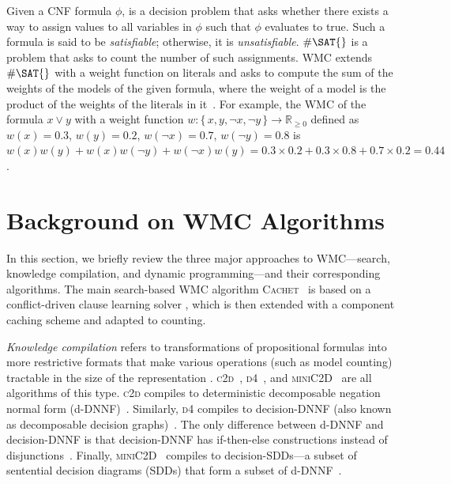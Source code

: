 \documentclass{article}
\theoremstyle{definition}
\begin{document}
Given a CNF formula $\phi$, \SAT{} is a decision problem that asks whether there
exists a way to assign values to all variables in $\phi$ such that $\phi$
evaluates to true. Such a formula is said to be \emph{satisfiable}; otherwise,
it is \emph{unsatisfiable}. $\#\SAT{}$ is a problem that asks to count the
number of such assignments. \textsf{WMC} extends $\#\SAT{}$ with a weight
function on literals and asks to compute the sum of the weights of the models of
the given formula, where the weight of a model is the product of the weights of
the literals in it~\cite{DBLP:journals/ai/ChaviraD08}. For example, the
\textsf{WMC} of the formula $x \lor y$ with a weight function $w\colon \{\,x, y,
\neg x, \neg y\,\} \to \mathbb{R}_{\ge 0}$ defined as $w(x) = 0.3$, $w(y) = 0.2$,
$w(\neg x) = 0.7$, $w(\neg y) = 0.8$ is $w(x)w(y)+w(x)w(\neg y)+w(\neg x)w(y) =
0.3 \times 0.2 + 0.3 \times 0.8 + 0.7 \times 0.2 = 0.44$.

\section{Background on \textsf{\textmd{WMC}} Algorithms}\label{sec:background}

In this section, we briefly review the three major approaches to \textsf{WMC}---search, knowledge compilation, and dynamic programming---and their corresponding algorithms. The main search-based \textsf{WMC} algorithm \textsc{Cachet}~\cite{DBLP:conf/sat/SangBBKP04} is based on a conflict-driven clause learning \SAT{} solver \cite{DBLP:conf/dac/MoskewiczMZZM01}, which is then extended with a component caching scheme and adapted to counting.

\emph{Knowledge compilation} refers to transformations of propositional formulas
into more restrictive formats that make various operations (such as model
counting) tractable in the size of the representation
\cite{DBLP:journals/jair/DarwicheM02}.
\textsc{c2d}~\cite{DBLP:conf/ecai/Darwiche04},
\textsc{d4}~\cite{DBLP:conf/ijcai/LagniezM17}, and
\textsc{miniC2D}~\cite{DBLP:conf/ijcai/OztokD15}
are all algorithms of this type. \textsc{c2d} compiles to deterministic
decomposable negation normal form
(d-DNNF)~\cite{DBLP:journals/jancl/Darwiche01}. Similarly, \textsc{d4} compiles
to decision-DNNF (also known as decomposable decision
graphs)~\cite{DBLP:conf/aaai/FargierM06}. The only difference between d-DNNF and
decision-DNNF is that decision-DNNF has if-then-else constructions instead of
disjunctions~\cite{DBLP:conf/ijcai/LagniezM17}. Finally,
\textsc{miniC2D}~\cite{DBLP:conf/ijcai/OztokD15} compiles to decision-SDDs---a
subset of sentential decision diagrams (SDDs) that form a subset of
d-DNNF~\cite{DBLP:conf/ijcai/Darwiche11}.
\end{document}
